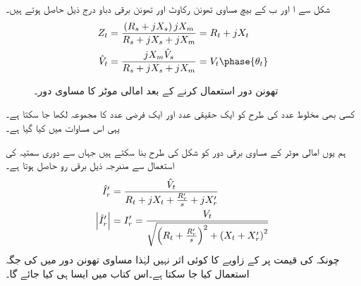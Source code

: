شکل   سے  ا اور ب کے بیچ مساوی تھونن  رکاوٹ  اور تھونن برقی دباو  درج ذیل حاصل ہوتے ہیں۔
\begin{gather}
\begin{aligned}\label{مساوات_امالی_تھونن_متغرات}
Z_t&=\frac{\left(R_s+j X_s \right) j X_m}{R_s +j X_s + j X_m}=R_t+j X_t\\
\hat{V}_t&=\frac{j X_m \hat{V}_s}{R_s +j X_s + j X_m}=V_t \phase{\theta_t}
\end{aligned}
\end{gather}
%
\begin{figure}
\centering
%
\caption{تھونن دور استعمال کرنے کے بعد امالی موٹر کا مساوی دور۔}
\label{شکل_امالی_تھونن_استعمال_کرتے_ہوئے}
\end{figure}
کسی بھی مخلوط عدد کی طرح   کو ایک حقیقی عدد  اور ایک فرضی عدد  کا مجموعہ لکھا جا سکتا ہے۔ یہی اس مساوات میں کیا گیا ہے۔

ہم یوں امالی موٹر کے مساوی برقی دور کو شکل   کی طرح بنا سکتے ہیں جہاں سے دوری سمتیہ کی استعمال سے مندرجہ ذیل برقی رو  حاصل ہوتا ہے۔
\begin{gather}
\begin{aligned}\label{مساوات_امالی_گھمتا_رو}
\hat{I}_r'&=\frac{\hat{V}_t}{R_t +  j X_t +\frac{R_r'}{s}+ j X_r'}\\
\abs{\hat{I}_r'}&=I_r'=\frac{V_t}{\sqrt{\left(R_t+\frac{R_r'}{s} \right)^2+\left(X_t+X_r' \right)^2}}
\end{aligned}
\end{gather}
چونکہ  کی   قیمت پر  کے زاویے کا کوئی اثر نہیں لہٰذا مساوی تھونن دور میں  کی جگہ   استعمال کیا جا سکتا ہے۔اس کتاب میں ایسا ہی کیا جائے گا۔ 

